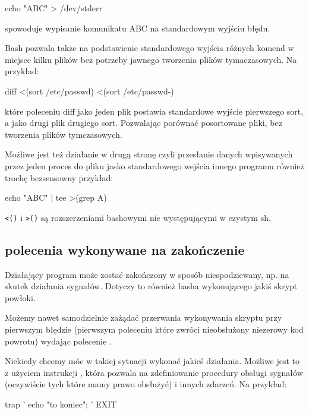 \begin{CodeFrame*}[bash]{}
echo "ABC" > /dev/stderr
\end{CodeFrame*}

\noindent
spowoduje wypisanie komunikatu ABC na standardowym wyjściu błędu.

Bash pozwala także na podstawienie standardowego wyjścia różnych komend
w miejsce kilku plików bez potrzeby jawnego tworzenia plików tymaczasowych. Na przykład:

\begin{CodeFrame*}[bash]{}
diff <(sort /etc/passwd) <(sort /etc/passwd-)
\end{CodeFrame*}

\noindent
które poleceniu diff jako jeden plik postawia standardowe wyjście pierwszego sort,
a jako drugi plik drugiego sort.
Pozwalając porównać posortowane pliki, bez tworzenia plików tymczasowych.

Możliwe jest też działanie w drugą stronę czyli przesłanie danych wpisywanych przez
jeden proces do pliku jasko standardowego wejścia innego programu
również trochę bezsensowny przykład:

\begin{CodeFrame*}[bash]{}
echo "ABC" | tee >(grep A)
\end{CodeFrame*}

\Verb#<()# i \Verb#>()# są rozszerzeniami bashowymi nie występującymi w czystym sh.

\subsection{polecenia wykonywane na zakończenie}

Działający program może zostać zakończony w sposób niespodziewany,
np. na skutek działania sygnałów.
Dotyczy to również basha wykonującego jakiś skrypt powłoki.

Możemy nawet samodzielnie zażądać przerwania wykonywania skryptu przy pierwszym błędzie
(pierwszym poleceniu które zwróci nieobsłużony niezerowy kod powrotu) wydając polecenie .

Niekiedy chcemy móc w takiej sytuacji wykonać jakieś działania.
Możliwe jest to z użyciem instrukcji , która pozwala na zdefiniowanie procedury
obsługi sygnałów (oczywiście tych które mamy prawo obsłużyć) i innych zdarzeń. Na przykład:

\begin{CodeFrame*}[bash]{}
trap '{ echo "to koniec"; }' EXIT
\end{CodeFrame*}

